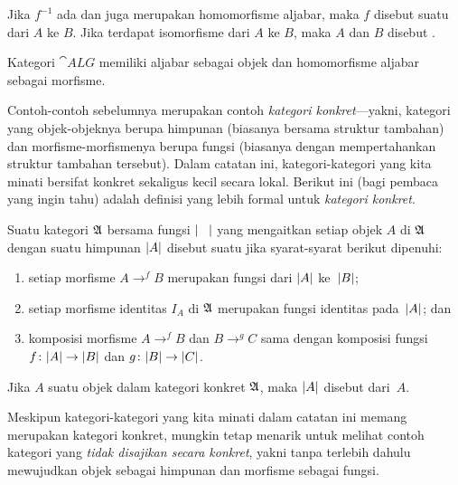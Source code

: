 \begin{defn}
Jika $f^{-1}$ ada dan juga merupakan homomorfisme aljabar, maka $f$ disebut suatu
 dari $A$ ke $B$. Jika terdapat isomorfisme dari $A$ ke $B$, maka $A$ dan
$B$ disebut
.
\end{defn}

\begin{exam} Kategori
$\cat{ALG}$ memiliki aljabar sebagai objek dan homomorfisme aljabar sebagai morfisme.
\end{exam}

Contoh-contoh sebelumnya merupakan contoh \emph{kategori konkret}---yakni, kategori
yang objek-objeknya berupa himpunan (biasanya bersama struktur tambahan) dan
morfisme-morfismenya berupa fungsi (biasanya dengan mempertahankan struktur tambahan tersebut). Dalam catatan ini,
kategori-kategori yang kita minati bersifat konkret sekaligus kecil secara lokal. Berikut ini (bagi pembaca yang ingin tahu) adalah
definisi yang lebih formal untuk \emph{kategori konkret}.

\begin{defn}\label{C015124} Suatu kategori $\mathfrak{A}$ bersama fungsi $\lvert\hphantom{O}\rvert$ yang mengaitkan
setiap objek $A$ di $\mathfrak{A}$ dengan suatu himpunan $\lvert A\rvert$ disebut suatu
 jika syarat-syarat berikut dipenuhi:
 \begin{enumerate}
    \item setiap morfisme $A \to^f B$ merupakan fungsi dari $\lvert A\rvert$ ke~$\lvert B\rvert$;
    \item setiap morfisme identitas $I_A$ di $\mathfrak{A}$ merupakan fungsi identitas pada~$\lvert A\rvert$; dan
    \item komposisi morfisme $A \to^f B$ dan $B \to^g C$ sama dengan komposisi
fungsi $f\colon \lvert A\rvert \rightarrow \lvert B\rvert$ dan $g\colon \lvert B\rvert \rightarrow \lvert C\rvert$.
 \end{enumerate}
Jika $A$ suatu objek dalam kategori konkret $\mathfrak{A}$, maka $\lvert A\rvert$ disebut
 dari~$A$.
\end{defn}

Meskipun kategori-kategori yang kita minati dalam catatan ini memang merupakan kategori
konkret, mungkin tetap menarik untuk melihat contoh kategori yang
\emph{tidak disajikan secara konkret}, yakni tanpa terlebih dahulu mewujudkan objek sebagai himpunan dan morfisme sebagai fungsi.

